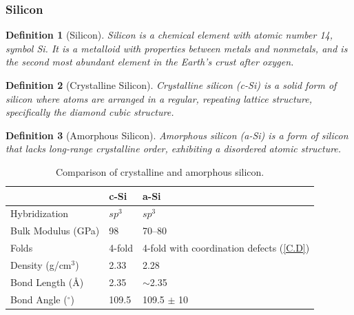 \documentclass{article}
\newtheorem{definition}{Definition}
\begin{document}
\subsubsection{Silicon}
\begin{definition}[Silicon]
    Silicon is a chemical element with atomic number 14, symbol Si. It is a metalloid with properties between metals and nonmetals, and is the second most abundant element in the Earth's crust after oxygen.
\end{definition}
\begin{definition}[Crystalline Silicon]
    Crystalline silicon (c-Si) is a solid form of silicon where atoms are arranged in a regular, repeating lattice structure, specifically the diamond cubic structure.
\end{definition}
\begin{definition}[Amorphous Silicon]
    Amorphous silicon (a-Si) is a form of silicon that lacks long-range crystalline order, exhibiting a disordered atomic structure.
\end{definition}
\begin{table}[H]
    \centering
    \begin{tabular}{p{}|p{}|p{}}
        \toprule
         & c-Si & a-Si \\
        \midrule
        Hybridization & $sp^3$ & $sp^3$ \\
        \hline
        Bulk Modulus (GPa)\footnotemark{} & 98\footnotemark{} & 70--80 \\
        \hline
        Folds & 4-fold & 4-fold with coordination defects (\ref{C.D}) \\
        \hline
        Density (g/cm$^3$)\footnotemark{} & 2.33 & 2.28 \\
        \hline
        Bond Length (\AA) & 2.35 & $\sim$2.35 \\
        \hline
        Bond Angle ($^\circ$) & 109.5 & 109.5 $\pm$ 10 \\
        \bottomrule
    \end{tabular}
    \caption{Comparison of crystalline and amorphous silicon.}
    \label{tab:cSi_vs_aSi}
\end{table}
\addtocounter{footnote}{-3}
\end{document}
